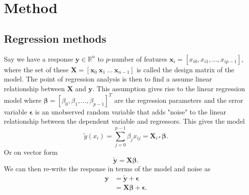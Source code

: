 \section{Method}



\begin{comment}
	Describe the methods and algorithms. You need to
	explain how you implemented the methods and also
	say something about the structure of your algorithm
	and present some parts of your code. You should
	plug in some calculations to demonstrate your code,
	such as selected runs used to validate and verify your
	results. The latter is extremely important! A reader
	needs to understand that your code reproduces selected
	benchmarks and reproduces previous results, either
	numerical and/or well-known closed form expressions.
\end{comment}


\subsection{Regression methods}
{
    Say we have a response $\mathbf{y}\in\mathbb{R}^n$ to $p$-number of features $\mathbf{x}_i=[x_{i0}, x_{i1},...,x_{ip-1}]$,
    where the set of these $\mathbf{X}=[\mathbf{x}_{0}\ \mathbf{x}_{1}\ ...\ \mathbf{x}_{n-1}]$ is called the design matrix of the model. 
    The point of regression analysis is then to find a assume linear relationship between $\mathbf{X}$ and $\mathbf{y}$. 
    This assumption gives rise to the linear regression model where $\boldsymbol\beta=\left[\beta_0, \beta_1, ..., \beta_{p-1} \right]^T$ 
    are the regression parameters and the error variable $\boldsymbol\epsilon$ is an unobserved random variable that adds 
    "noise" to the linear relationship between the dependent variable and regressors. This gives the model
    \begin{equation*}
        \tilde{y}(x_i) = \sum_{j=0}^{p-1} \beta_j x_{ij}=\mathbf X_{i*}\boldsymbol{\beta}.
    \end{equation*}
    Or on vector form
    \begin{equation*}
    \boldsymbol{\tilde y} = \mathbf{X}\boldsymbol\beta.
    \end{equation*}
    We can then re-write the response in terms of the model and noise as
    \begin{align*}
    \label{eq:linear_regression}
        \mathbf{y} 
        &=\boldsymbol{\tilde y} + \boldsymbol{\epsilon}\\
        &=\mathbf{X}\boldsymbol{\beta} + \boldsymbol{\epsilon}.
    \end{align*}
}




